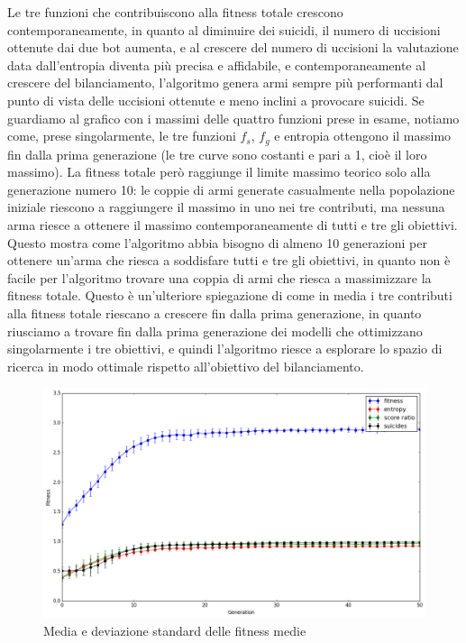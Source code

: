 \documentclass[12pt, italian]{toptesi}
\begin{document}
Le tre funzioni che contribuiscono alla fitness totale crescono contemporaneamente, in quanto al diminuire dei suicidi, il numero di uccisioni ottenute dai due bot aumenta, e al crescere del numero di uccisioni la valutazione data dall'entropia diventa più precisa e affidabile, e contemporaneamente al crescere del bilanciamento, l'algoritmo genera armi sempre più performanti dal punto di vista delle uccisioni ottenute e meno inclini a provocare suicidi.
Se guardiamo al grafico con i massimi delle quattro funzioni prese in esame, notiamo come, prese singolarmente, le tre funzioni $f_s$, $f_g$ e entropia ottengono il massimo fin dalla prima generazione (le tre curve sono costanti e pari a 1, cioè il loro massimo). La fitness totale però raggiunge il limite massimo teorico solo alla generazione numero 10: le coppie di armi generate casualmente nella popolazione iniziale riescono a raggiungere il massimo in uno nei tre contributi, ma nessuna arma riesce a ottenere il massimo contemporaneamente di tutti e tre gli obiettivi.
Questo mostra come l'algoritmo abbia bisogno di almeno 10 generazioni per ottenere un'arma che riesca a soddisfare tutti e tre gli obiettivi, in quanto non è facile per l'algoritmo trovare una coppia di armi che riesca a massimizzare la fitness totale.
Questo è un'ulteriore spiegazione di come in media i tre contributi alla fitness totale riescano a crescere fin dalla prima generazione, in quanto riusciamo a trovare fin dalla prima generazione dei modelli che ottimizzano singolarmente i tre obiettivi, e quindi l'algoritmo riesce a esplorare lo spazio di ricerca in modo ottimale rispetto all'obiettivo del bilanciamento.

\begin{figure}[tp]
\centering
\includegraphics[width=1.0\textwidth]{avg_of_avg}
\caption{Media e deviazione standard delle fitness medie}
\label{fig:avg_of_avg}
\end{figure}
\end{document}
